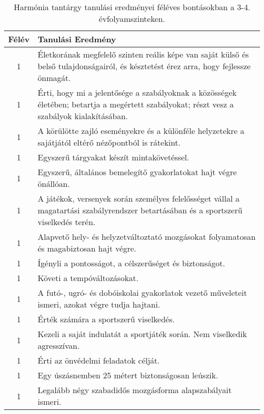        
           \begin{longtable}{c | p{12cm} }
            \caption[Harmónia 3-4.]{Harmónia tantárgy tanulási eredményei féléves bontásokban a 3-4. évfolyamszinteken. }  \\

            \textbf{Félév} & \textbf{Tanulási Eredmény} \\
            \hline
            \endhead
                                
                                      
                                
                                          1 &  Életkorának megfelelő szinten reális képe van saját külső és belső tulajdonságairól, és késztetést érez arra, hogy fejlessze önmagát. \\ \hline
                                          1 &  Érti, hogy mi a jelentősége a szabályoknak a közösségek életében; betartja a megértett szabályokat; részt vesz a szabályok kialakításában. \\ \hline
                                          1 &  A körülötte zajló eseményekre és a különféle helyzetekre a sajátjától eltérő nézőpontból is rátekint. \\ \hline
                                          1 &  Egyszerű tárgyakat készít mintakövetéssel. \\ \hline
                                          1 &  Egyszerű, általános bemelegítő gyakorlatokat hajt végre önállóan. \\ \hline
                                          1 &  A játékok, versenyek során személyes felelősséget vállal a magatartási szabályrendszer betartásában és a sportszerű viselkedés terén. \\ \hline
                                          1 &  Alapvető hely- és helyzetváltoztató mozgásokat folyamatosan és magabiztosan hajt végre. \\ \hline
                                          1 &  Ígényli a pontosságot, a célszerűséget és biztonságot. \\ \hline
                                          1 &  Követi a tempóváltozásokat. \\ \hline
                                          1 &  A futó-, ugró- és dobóiskolai gyakorlatok vezető műveleteit ismeri, azokat végre tudja hajtani. \\ \hline
                                          1 &  Érték számára a sportszerű viselkedés. \\ \hline
                                          1 &  Kezeli a saját indulatát a sportjáték során. Nem viselkedik agresszívan. \\ \hline
                                          1 &  Érti az önvédelmi feladatok célját. \\ \hline
                                          1 &  Egy úszásnemben 25 métert biztonságosan leúszik. \\ \hline
                                          1 &  Legalább négy szabadidős mozgásforma alapszabályait ismeri. \\ \hline
                                      

\end{longtable}
